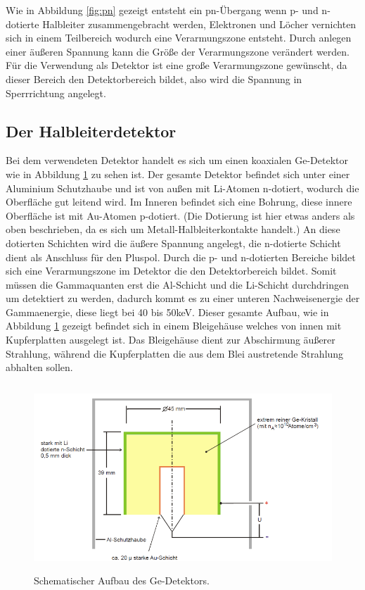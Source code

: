 Wie in Abbildung \ref{fig:pn} gezeigt entsteht ein pn-Übergang wenn p- und n-dotierte Halbleiter zusammengebracht werden,
Elektronen und Löcher vernichten sich in einem Teilbereich wodurch eine Verarmungszone entsteht.
Durch anlegen einer äußeren Spannung kann die Größe der Verarmungszone verändert werden. Für die
Verwendung als Detektor ist eine große Verarmungszone gewünscht, da dieser Bereich den
Detektorbereich bildet, also wird die Spannung in Sperrrichtung angelegt.


\subsection{Der Halbleiterdetektor}
Bei dem verwendeten Detektor handelt es sich um einen koaxialen Ge-Detektor wie in Abbildung
\ref{fig:Aufbau} zu sehen ist. Der gesamte Detektor befindet sich unter einer Aluminium
Schutzhaube und ist von außen mit Li-Atomen n-dotiert, wodurch die Oberfläche
gut leitend wird. Im Inneren befindet sich eine Bohrung, diese innere Oberfläche ist
mit Au-Atomen p-dotiert. (Die Dotierung ist hier etwas anders als oben beschrieben, da es sich um
Metall-Halbleiterkontakte handelt.) An diese dotierten Schichten wird die
äußere Spannung angelegt, die n-dotierte Schicht dient als Anschluss für den Pluspol.
Durch die p- und n-dotierten Bereiche bildet sich eine
Verarmungszone im Detektor die den Detektorbereich bildet. Somit müssen die Gammaquanten erst
die Al-Schicht und die Li-Schicht durchdringen um detektiert zu werden, dadurch kommt es zu einer
unteren Nachweisenergie der Gammaenergie, diese liegt bei 40 bis 50\;keV.
Dieser gesamte Aufbau, wie in Abbildung \ref{fig:Aufbau} gezeigt befindet sich in einem
Bleigehäuse welches von innen mit Kupferplatten ausgelegt ist. Das Bleigehäuse dient zur Abschirmung
äußerer Strahlung, während die Kupferplatten die aus dem Blei austretende Strahlung
abhalten sollen.

\begin{figure}
  \centering
  \includegraphics[height=7cm]{Aufbau.png}
  \caption{Schematischer Aufbau des Ge-Detektors. \cite{skript}}
  \label{fig:Aufbau}
\end{figure}

